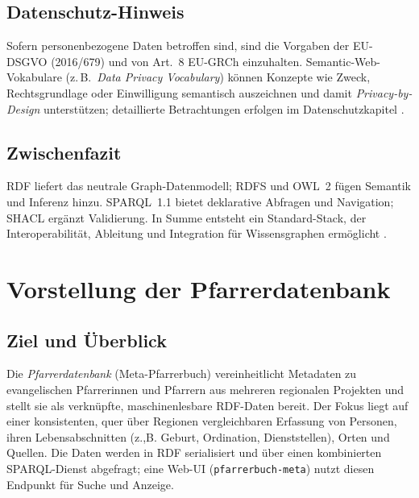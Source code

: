 \subsection{Datenschutz-Hinweis}

Sofern personenbezogene Daten betroffen sind, sind die Vorgaben der EU-DSGVO (2016/679) und von Art.~8 EU-GRCh einzuhalten. Semantic-Web-Vokabulare (z.\,B.\ \emph{Data Privacy Vocabulary}) können Konzepte wie Zweck, Rechtsgrundlage oder Einwilligung semantisch auszeichnen und damit \emph{Privacy-by-Design} unterstützen; detaillierte Betrachtungen erfolgen im Datenschutzkapitel \cite{GDPR2016}.

\subsection*{Zwischenfazit}

RDF liefert das neutrale Graph-Datenmodell; RDFS und OWL~2 fügen Semantik und Inferenz hinzu. SPARQL~1.1 bietet deklarative Abfragen und Navigation; SHACL ergänzt Validierung. In Summe entsteht ein Standard-Stack, der Interoperabilität, Ableitung und Integration für Wissensgraphen ermöglicht \cite{Hitzler,RDF11Primer,RDFS11,OWL2Overview,SPARQL11Overview,HoganKG}.







\section{Vorstellung der Pfarrerdatenbank}
\label{sec:Pfarrerdatenbank}

\subsection{Ziel und Überblick}
Die \emph{Pfarrerdatenbank} (Meta-Pfarrerbuch) vereinheitlicht Metadaten zu evangelischen Pfarrerinnen und Pfarrern aus mehreren regionalen Projekten und stellt sie als verknüpfte, maschinenlesbare RDF-Daten bereit. Der Fokus liegt auf einer konsistenten, quer über Regionen vergleichbaren Erfassung von Personen, ihren Lebensabschnitten (z.,B. Geburt, Ordination, Dienststellen), Orten und Quellen. Die Daten werden in RDF serialisiert und über einen kombinierten SPARQL-Dienst abgefragt; eine Web-UI (\texttt{pfarrerbuch-meta}) nutzt diesen Endpunkt für Suche und Anzeige.

